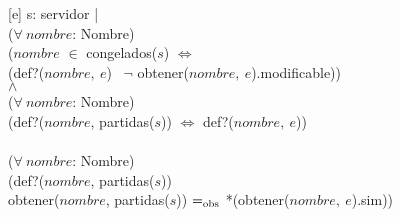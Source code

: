 \begin{Representacion}
    [e]{
        s: servidor | \\
            \tab ($\forall\ nombre$: Nombre)\\
                \tab\tab ($nombre$ $\in$ congelados($s$) $\Leftrightarrow$ \\
                \tab\tab (def?($nombre,\ e$) \yluego\ $\neg$ obtener($nombre,\ e$).modificable)) \\
            \tab $\wedge$ \\
            \tab ($\forall\ nombre$: Nombre)\\
                \tab\tab (def?($nombre$, partidas($s$)) $\Leftrightarrow$ def?($nombre,\ e$)) \\
            \tab \yluego \\
            \tab ($\forall\ nombre$: Nombre)\\
                \tab\tab (def?($nombre$, partidas($s$)) \impluego \\ 
                \tab\tab obtener($nombre$, partidas($s$)) $=_{\mathrm{obs}}$ *(obtener($nombre,\ e$).sim)) \\
    }  


  \end{Representacion}
  

